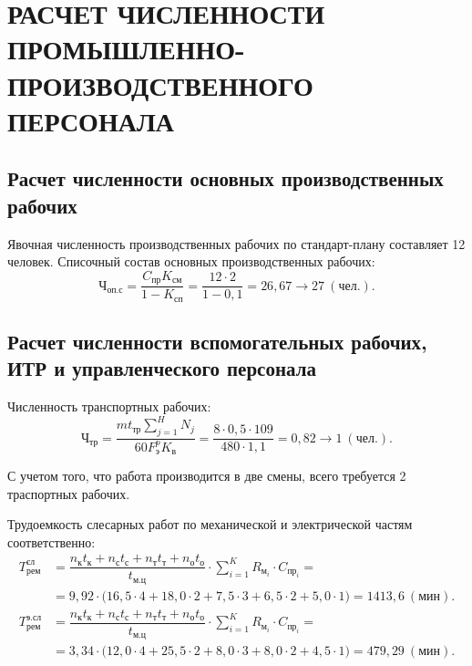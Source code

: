 \section[
Расчет численности промышленно-производственного персонала]{
РАСЧЕТ ЧИСЛЕННОСТИ \\
ПРОМЫШЛЕННО-ПРОИЗВОДСТВЕННОГО \\
ПЕРСОНАЛА
}
\label{sec:number}

\subsection[
Расчет численности основных производственных рабочих
]{
Расчет численности основных производственных рабочих
}

Явочная численность производственных рабочих по стандарт-плану
составляет 12 человек.
Списочный состав основных производственных рабочих:
\begin{equation*}
  \text{Ч}_{\text{оп.с}} = 
    \dfrac{C_{\text{пр}}K_{см}}{1-K_{\text{сп}}} =
    \dfrac{12 \cdot 2}{1-0{,}1} =
    26{,}67 \rightarrow 27 \: (\text{чел.}).
\end{equation*}

\subsection[
Расчет численности вспомогательных рабочих, ИТР и \\
управленческого персонала
]{
Расчет численности вспомогательных рабочих, 
ИТР и управленческого персонала
}

Численность транспортных рабочих:
\begin{equation*}
  \text{Ч}_{\text{тр}} = 
  \dfrac{m t_{\text{тр}} \sum^H_{j=1} N_j}{60 F^p_{\text{э}} K_{\text{в}}} =
  \dfrac{8 \cdot 0{,}5 \cdot 109}{480 \cdot 1{,}1} =
  0{,}82 \rightarrow 1 \: (\text{чел.}).
\end{equation*}

С учетом того, что работа производится в две смены, 
всего требуется 2 траспортных рабочих.

Трудоемкость слесарных работ по механической и электрической частям соответственно:
{\small
\begin{align*}
  T^{\text{сл}}_{\text{рем}} &= 
  \dfrac{
    n_{\text{к}}t_{\text{к}} + n_{\text{с}}t_{\text{с}} +
    n_{\text{т}}t_{\text{т}} + n_{\text{о}}t_{\text{о}}
  }{
    t_{\text{м.ц}}
  } \cdot \sum^K_{i=1} R_{\text{м}_i} \cdot C_{\text{пр}_i} = \\
  &= 9{,}92
    \cdot
    \big(
      16{,}5 \cdot 4 + 18{,}0 \cdot 2 + 7{,}5 \cdot 3 + 
      6{,}5 \cdot 2 + 5{,}0 \cdot 1
    \big) =
    1413{,}6 \: (\text{мин}). 
  \\
  T^{\text{э.сл}}_{\text{рем}} &= 
  \dfrac{
    n_{\text{к}}t_{\text{к}} + n_{\text{с}}t_{\text{с}} +
    n_{\text{т}}t_{\text{т}} + n_{\text{о}}t_{\text{о}}
  }{
    t_{\text{м.ц}}
  } \cdot \sum^K_{i=1} R_{\text{м}_i} \cdot C_{\text{пр}_i} = \\
  &= 3{,}34
    \cdot
    \big(
      12{,}0 \cdot 4 + 25{,}5 \cdot 2 + 8{,}0 \cdot 3 + 
      8{,}0 \cdot 2 + 4{,}5 \cdot 1
    \big) =
    479{,}29 \: (\text{мин}).
\end{align*}
}

